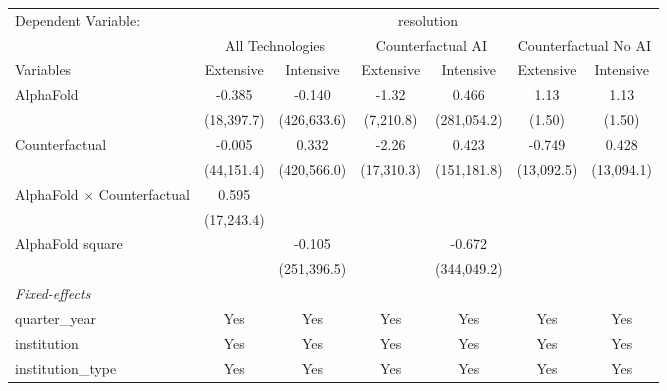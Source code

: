 \begingroup
\centering
\begin{tabular}{lcccccc}
   \tabularnewline \midrule \midrule
   Dependent Variable: & \multicolumn{6}{c}{resolution}\\
 & \multicolumn{2}{c}{All Technologies} & \multicolumn{2}{c}{Counterfactual AI} & \multicolumn{2}{c}{Counterfactual No AI} \\
\cmidrule(lr){1-1}\cmidrule(lr){2-3} \cmidrule(lr){4-5} \cmidrule(lr){6-7}
Variables & \multicolumn{1}{c}{Extensive} & \multicolumn{1}{c}{Intensive} & \multicolumn{1}{c}{Extensive} & \multicolumn{1}{c}{Intensive} & \multicolumn{1}{c}{Extensive} & \multicolumn{1}{c}{Intensive} \\
\cmidrule(lr){1-1}\cmidrule(lr){2-2} \cmidrule(lr){3-3} \cmidrule(lr){4-4} \cmidrule(lr){5-5} \cmidrule(lr){6-6} \cmidrule(lr){7-7}
   AlphaFold                          & -0.385     & -0.140      & -1.32      & 0.466       & 1.13       & 1.13\\   
                                      & (18,397.7) & (426,633.6) & (7,210.8)  & (281,054.2) & (1.50)     & (1.50)\\   
   Counterfactual                     & -0.005     & 0.332       & -2.26      & 0.423       & -0.749     & 0.428\\   
                                      & (44,151.4) & (420,566.0) & (17,310.3) & (151,181.8) & (13,092.5) & (13,094.1)\\   
   AlphaFold $\times$ Counterfactual  & 0.595      &             &            &             &            &   \\   
                                      & (17,243.4) &             &            &             &            &   \\   
   AlphaFold square                   &            & -0.105      &            & -0.672      &            &   \\   
                                      &            & (251,396.5) &            & (344,049.2) &            &   \\   
   \midrule
   \emph{Fixed-effects}\\
   quarter\_year                      & Yes        & Yes         & Yes        & Yes         & Yes        & Yes\\  
   institution                        & Yes        & Yes         & Yes        & Yes         & Yes        & Yes\\  
   institution\_type                  & Yes        & Yes         & Yes        & Yes         & Yes        & Yes\\  

\end{tabular}
